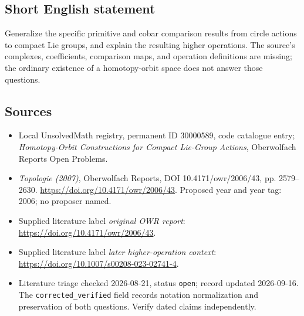 \documentclass[11pt]{article}
\begin{document}
\subsection{Short English statement}
Generalize the specific primitive and cobar comparison results from circle actions to compact Lie groups, and explain the resulting higher operations. The source's complexes, coefficients, comparison maps, and operation definitions are missing; the ordinary existence of a homotopy-orbit space does not answer those questions.
\subsection{Sources}
\begin{itemize}\item Local UnsolvedMath registry, permanent ID 30000589, code catalogue entry; \emph{Homotopy-Orbit Constructions for Compact Lie-Group Actions}, Oberwolfach Reports Open Problems.\item \emph{Topologie (2007)}, Oberwolfach Reports, DOI 10.4171/owr/2006/43, pp. 2579--2630. \url{https://doi.org/10.4171/owr/2006/43}. Proposed year and year tag: 2006; no proposer named.\item Supplied literature label \emph{original OWR report}: \url{https://doi.org/10.4171/owr/2006/43}.\item Supplied literature label \emph{later higher-operation context}: \url{https://doi.org/10.1007/s00208-023-02741-4}.\item Literature triage checked 2026-08-21, status \texttt{open}; record updated 2026-09-16. The \texttt{corrected\_verified} field records notation normalization and preservation of both questions. Verify dated claims independently.\end{itemize}
\end{document}
